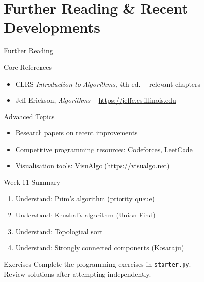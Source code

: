 \documentclass[aspectratio=169,xcolor=dvipsnames]{beamer}
\begin{document}
\section{Further Reading \& Recent Developments}
\begin{frame}{Further Reading}
  \begin{block}{Core References}
    \begin{itemize}
      \item CLRS \textit{Introduction to Algorithms}, 4th ed.\ -- relevant chapters
      \item Jeff Erickson, \textit{Algorithms} -- \url{https://jeffe.cs.illinois.edu}
    \end{itemize}
  \end{block}
  \begin{exampleblock}{Advanced Topics}
    \begin{itemize}
      \item Research papers on recent improvements
      \item Competitive programming resources: Codeforces, LeetCode
      \item Visualisation tools: VisuAlgo (\url{https://visualgo.net})
    \end{itemize}
  \end{exampleblock}
\end{frame}

\begin{frame}{Week 11 Summary}
  \begin{enumerate}
    \item Understand: Prim's algorithm (priority queue)
    \item Understand: Kruskal's algorithm (Union-Find)
    \item Understand: Topological sort
    \item Understand: Strongly connected components (Kosaraju)
  \end{enumerate}
  \begin{block}{Exercises}
    Complete the programming exercises in \texttt{starter.py}.\\
    Review solutions after attempting independently.
  \end{block}
\end{frame}
\end{document}
